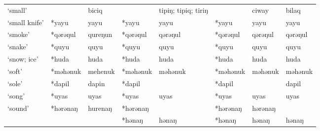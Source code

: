 \begin{landscape}
\begin{longtable}[c]{@{}p{3cm}<{\raggedright}p{2.75cm}<{\raggedright}p{2.75cm}<{\raggedright}p{2.75cm}<{\raggedright}p{2.75cm}<{\raggedright}p{2.75cm}<{\raggedright}p{2.75cm}<{\raggedright}p{2.75cm}<{\raggedright}@{}}
`small'                                              &                    & biciq                          &                    & tipiŋ; tipiq; tiriŋ        &                  & ciway                    & bilaq                             \\
`small knife'                                        & *yayu              & yayu                           & *yayu              & yayu                       & *yayu            & yayu                     & yayu                              \\
`smoke'                                              & *qərəŋul           & qureŋun                        & *qərəŋul           & qərəŋul                    & *qərəŋul         & qərəŋul                  & qərəŋul                           \\
`snake'                                              & *quyu              & quyu                           & *quyu              & quyu                       & *quyu            & quyu                     & quyu                              \\
`snow; ice'                                          & *huda              & huda                           & *huda              & huda                       & *huda            & huda                     & huda                              \\
`soft'                                               & *məhənuk           & mehenuk                        & *məhənuk           & məhənuk                    & *məhənuk         & məhənuk                  & məhənuk                           \\
`sole'                                               & *dapil             & dapin                          & *dapil             &                            & *dapil           &                          & dapil                             \\
`song'                                               & *uyas              & uyas                           & *uyas              & uyas                       & *uyas            & uyas                     & uyas                              \\
`sound'                                              & *hərənaŋ           & hurenaŋ                        & *hərənaŋ           &                            & *hərənaŋ         & hərənaŋ                  &                                   \\
                                                     &                    &                                & *hənaŋ             & hənaŋ                      & *hənaŋ           & hənaŋ                    & hənaŋ                             \\

\end{longtable}
\end{landscape}
